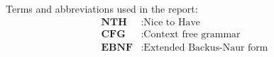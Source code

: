 
Terms and abbreviations used in the report:
\begin{align*}
    \textbf{NTH} &: \text{Nice to Have} \\
    \textbf{CFG} &: \text{Context free grammar} \\
    \textbf{EBNF} &: \text{Extended Backus-Naur form} \\
\end{align*}